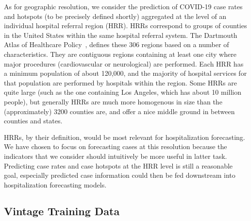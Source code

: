 \documentclass[9pt,twocolumn,twoside,lineno]{pnas-new}
\begin{document}
As for geographic resolution, we consider the prediction of COVID-19 case rates
and hotspots (to be precisely defined shortly) aggregated at the level of an
individual hospital referral region (HRR). HRRs correspond to groups of counties
in the United States within the same hospital referral system. The Dartmouth
Atlas of Healthcare Policy~\cite{DartmouthHRR}, defines these 306 regions based
on a number of characteristics. They are contiguous regions containing at least
one city where major procedures (cardiovascular or neurological) are
performed. Each HRR has a minimum population of about 120,000, and the majority
of hospital services for that population are performed by hospitals within the
region. Some HRRs are quite large (such as the one containing Los Angeles, which
has about 10 million people), but generally HRRs are much more homogenous in
size than the (approximately) 3200 counties are, and offer a nice middle ground
in between counties and states. 

HRRs, by their definition, would be most relevant for hospitalization
forecasting.  We have chosen to focus on forecasting cases at this resolution 
because the indicators that we consider should intuitively be more useful in
latter task.  Predicting case rates and case hotspots at the HRR level is still
a reasonable goal, especially predicted case information could then be fed
downstream into hospitalization forecasting models. 

\subsection{Vintage Training Data}

\end{document}
